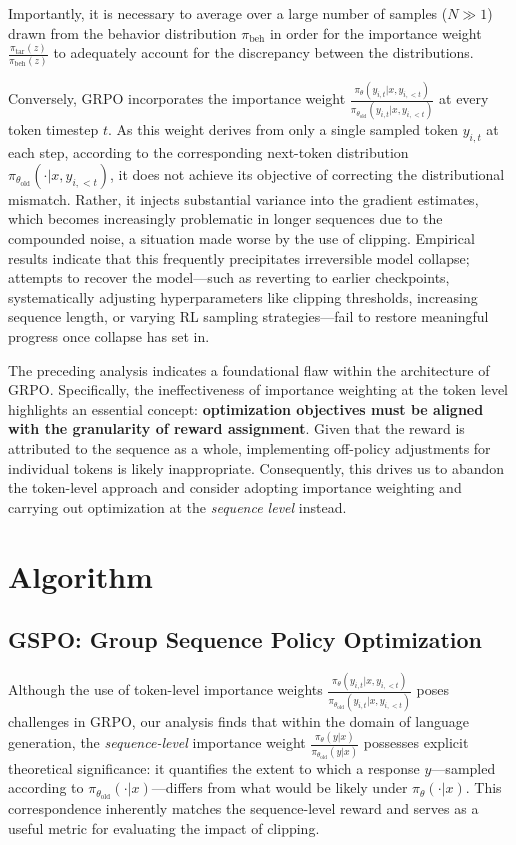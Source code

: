 Importantly, it is necessary to average over a large number of samples ($N \gg 1$) drawn from the behavior distribution $\pi_\text{beh}$ in order for the importance weight $\frac{ \pi_\text{tar} (z) }{ \pi_\text{beh} (z)}$ to adequately account for the discrepancy between the distributions.

Conversely, GRPO incorporates the importance weight $\frac{ \pi_{\theta} (y_{i,t} | x, y_{i,<t}) }{ \pi_{\theta_\text{old}} (y_{i,t} | x,y_{i,<t})}$ at every token timestep $t$. As this weight derives from only a single sampled token $y_{i,t}$ at each step, according to the corresponding next-token distribution $\pi_{\theta_\text{old}}( \cdot | x, y_{i, <t})$, it does not achieve its objective of correcting the distributional mismatch. Rather, it injects substantial variance into the gradient estimates, which becomes increasingly problematic in longer sequences due to the compounded noise, a situation made worse by the use of clipping. Empirical results indicate that this frequently precipitates irreversible model collapse; attempts to recover the model—such as reverting to earlier checkpoints, systematically adjusting hyperparameters like clipping thresholds, increasing sequence length, or varying RL sampling strategies—fail to restore meaningful progress once collapse has set in.

The preceding analysis indicates a foundational flaw within the architecture of GRPO. Specifically, the ineffectiveness of importance weighting at the token level highlights an essential concept: \textbf{optimization objectives must be aligned with the granularity of reward assignment}. Given that the reward is attributed to the sequence as a whole, implementing off-policy adjustments for individual tokens is likely inappropriate. Consequently, this drives us to abandon the token-level approach and consider adopting importance weighting and carrying out optimization at the \textit{sequence level} instead.

\section{Algorithm}

\subsection{GSPO: Group Sequence Policy Optimization}

Although the use of token-level importance weights $\frac{ \pi_{\theta} (y_{i,t} | x, y_{i,<t}) }{ \pi_{\theta_\text{old}} (y_{i,t} | x,y_{i,<t})}$ poses challenges in GRPO, our analysis finds that within the domain of language generation, the \textit{sequence-level} importance weight $\frac{ \pi_{\theta} (y | x) }{ \pi_{\theta_\text{old}} (y | x)}$ possesses explicit theoretical significance: it quantifies the extent to which a response $y$—sampled according to $\pi_{\theta_\text{old}} (\cdot | x)$—differs from what would be likely under $\pi_{\theta} (\cdot | x)$. This correspondence inherently matches the sequence-level reward and serves as a useful metric for evaluating the impact of clipping.

